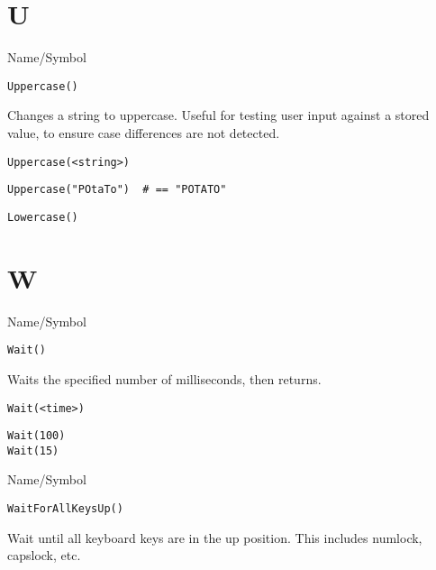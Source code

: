 \rl
\section{U}
\rl


\begin{desc}{Name/Symbol}
\item[Name/Symbol]  	\verb+Uppercase()+

\item[Description]  	Changes a string to uppercase.  Useful for testing user
	      	input against a stored value, to ensure case differences
	      	are not detected.

\item[Usage]
\begin{verbatim}
Uppercase(<string>)
\end{verbatim}

\item[Example]     
\begin{verbatim}
Uppercase("POtaTo")  # == "POTATO"
\end{verbatim}

\item[See Also]     	\verb+Lowercase()+
\end{desc}

\rl
\section{W}
\rl


\begin{desc}{Name/Symbol}
\item[Name/Symbol]  	\verb+Wait()+ 

\item[Description] 	Waits the specified number of milliseconds, then returns. 

\item[Usage]
\begin{verbatim}
Wait(<time>)
\end{verbatim}

\item[Example]
\begin{verbatim}
Wait(100)
Wait(15)
\end{verbatim}

\item[See Also]	
\end{desc}

\rl


\begin{desc}{Name/Symbol}
\item[Name/Symbol]  	\verb+WaitForAllKeysUp()+

\item[Description]	
               Wait until all keyboard keys are in the up
               position. This includes numlock, capslock, etc.
\item[Usage]		

\item[Example]	

\item[See Also]	

\end{desc}

